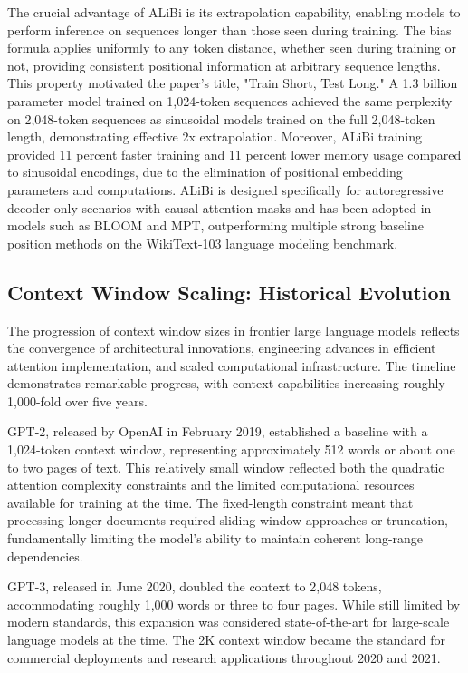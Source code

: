 The crucial advantage of ALiBi is its extrapolation capability, enabling models to perform inference on sequences longer than those seen during training. The bias formula applies uniformly to any token distance, whether seen during training or not, providing consistent positional information at arbitrary sequence lengths. This property motivated the paper's title, "Train Short, Test Long." A 1.3 billion parameter model trained on 1,024-token sequences achieved the same perplexity on 2,048-token sequences as sinusoidal models trained on the full 2,048-token length, demonstrating effective 2x extrapolation. Moreover, ALiBi training provided 11 percent faster training and 11 percent lower memory usage compared to sinusoidal encodings, due to the elimination of positional embedding parameters and computations. ALiBi is designed specifically for autoregressive decoder-only scenarios with causal attention masks and has been adopted in models such as BLOOM and MPT, outperforming multiple strong baseline position methods on the WikiText-103 language modeling benchmark.

\subsection{Context Window Scaling: Historical Evolution}

The progression of context window sizes in frontier large language models reflects the convergence of architectural innovations, engineering advances in efficient attention implementation, and scaled computational infrastructure. The timeline demonstrates remarkable progress, with context capabilities increasing roughly 1,000-fold over five years.

GPT-2, released by OpenAI in February 2019, established a baseline with a 1,024-token context window, representing approximately 512 words or about one to two pages of text. This relatively small window reflected both the quadratic attention complexity constraints and the limited computational resources available for training at the time. The fixed-length constraint meant that processing longer documents required sliding window approaches or truncation, fundamentally limiting the model's ability to maintain coherent long-range dependencies.

GPT-3, released in June 2020, doubled the context to 2,048 tokens, accommodating roughly 1,000 words or three to four pages. While still limited by modern standards, this expansion was considered state-of-the-art for large-scale language models at the time. The 2K context window became the standard for commercial deployments and research applications throughout 2020 and 2021.

